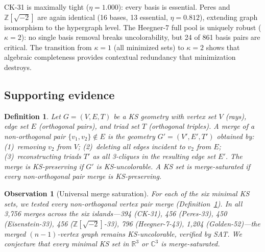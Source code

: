 \documentclass[12pt,a4paper]{article}
\newtheorem{definition}[theorem]{Definition}
\newtheorem{observation}[theorem]{Observation}
\newcommand{\R}{\mathbb{R}}
\newcommand{\C}{\mathbb{C}}
\newcommand{\Z}{\mathbb{Z}}
\begin{document}
CK-31 is maximally tight ($\eta = 1.000$): every basis is essential.  Peres and $\Z[\sqrt{-2}]$ are again identical (16 bases, 13 essential, $\eta = 0.812$), extending graph isomorphism to the hypergraph level.  The Heegner-7 full pool is uniquely robust ($\kappa = 2$): no single basis removal breaks uncolorability, but 24 of 861 basis pairs are critical.  The transition from $\kappa = 1$ (all minimized sets) to $\kappa = 2$ shows that algebraic completeness provides contextual redundancy that minimization destroys.

\subsection{Supporting evidence}\label{sec:supporting}

\begin{definition}\label{def:merge}
Let $G = (V, E, T)$ be a KS geometry with vertex set $V$ (rays), edge set $E$ (orthogonal pairs), and triad set $T$ (orthogonal triples).  A \emph{merge} of a non-orthogonal pair $\{v_1, v_2\} \notin E$ is the geometry $G' = (V', E', T')$ obtained by: (1)~removing $v_2$ from $V$; (2)~deleting all edges incident to $v_2$ from $E$; (3)~reconstructing triads $T'$ as all 3-cliques in the resulting edge set $E'$.  The merge is \emph{KS-preserving} if $G'$ is KS-uncolorable.  A KS set is \emph{merge-saturated} if every non-orthogonal pair merge is KS-preserving.
\end{definition}

\begin{observation}[Universal merge saturation]\label{obs:merge}
For each of the six minimal KS sets, we tested every non-orthogonal vertex pair merge (Definition~\ref{def:merge}). In all 3{,}756 merges across the six islands---394 (CK-31), 456 (Peres-33), 450 (Eisenstein-33), 456 ($\Z[\sqrt{-2}]$-33), 796 (Heegner-7-43), 1{,}204 (Golden-52)---the merged $(n{-}1)$-vertex graph remains KS-uncolorable, verified by SAT. We conjecture that every minimal KS set in $\R^3$ or $\C^3$ is merge-saturated.
\end{observation}
\end{document}
